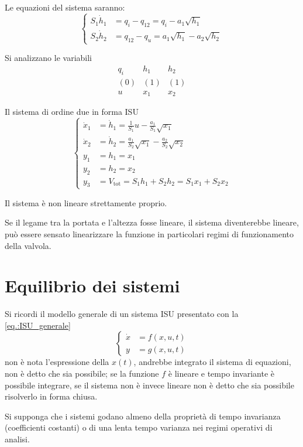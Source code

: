 Le equazioni del sistema saranno:
$$\left\{\begin{aligned}
S_1\dot h_1 &= q_i - q_{12} = q_i - a_1\sqrt{h_1} \\
S_2 \dot h_2 &= q_{12} - q_u = a_1\sqrt{h_1} - a_2\sqrt{h_2}
\end{aligned}\right.$$

Si analizzano le variabili
$$\begin{matrix}
q_i & h_1 & h_2 \\
(0) & (1) & (1) \\
u & x_1 & x_2
\end{matrix}$$

Il sistema di ordine due in forma ISU
$$\left\{\begin{aligned}
\dot x_1 &= \dot h_1 = \frac{1}{S_1} u - \frac{a_1}{S_1} \sqrt{x_1} \\
\dot x_2 &= \dot h_2 = \frac{a_1}{S_2}\sqrt{x_1} - \frac{a_2}{S_2} \sqrt{x_2} \\
y_1 &= h_1 = x_1 \\
y_2 &= h_2 =x_2 \\
y_3 &= V_{\text{tot}} = S_1h_1 + S_2h_2 = S_1x_1 + S_2 x_2
\end{aligned}\right.$$

Il sistema è non lineare strettamente proprio.

Se il legame tra la portata e l'altezza fosse lineare, il sistema diventerebbe
lineare, può essere sensato linearizzare la funzione in particolari regimi di
funzionamento della valvola.


\section{Equilibrio dei sistemi}
Si ricordi il modello generale di un sistema ISU presentato con la
\ref{eq.:ISU_generale}
$$
\left\{\begin{aligned}
\dot x & = f(x,u,t) \\
y &= g(x,u,t)
\end{aligned}\right.
$$
non è nota l'espressione della $x(t)$, andrebbe
integrato il sistema di equazioni, non è detto che sia possibile; se la
funzione $f$ è lineare e tempo invariante è possibile integrare, se il sistema
non è invece lineare non è detto che sia possibile risolverlo in forma chiusa.

Si supponga che i sistemi godano almeno della proprietà di tempo invarianza
(coefficienti costanti) o di una lenta tempo varianza nei regimi operativi di
analisi.

